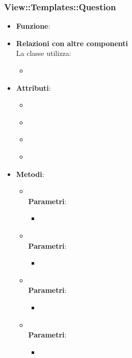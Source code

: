 \subsubsection{View::Templates::Question}
\begin{itemize}
\item\textbf{Funzione}:
\item\textbf{Relazioni con altre componenti}\\
La classe utilizza:
	\begin{itemize}
		\item
	\end{itemize}
\item\textbf{Attributi}:
	\begin{itemize}
		\item\code{}\\
		\item\code{}\\
		\item\code{}\\
		\item\code{}\\
	\end{itemize}
\item\textbf{Metodi}:
	\begin{itemize}
		\item\code{}\\
		\textbf{Parametri}:
			\begin{itemize}
				\item\code{}\\
			\end{itemize}
		\item\code{}\\
		\textbf{Parametri}:
			\begin{itemize}
				\item\code{}\\
			\end{itemize}
		\item\code{}\\
		\textbf{Parametri}:
			\begin{itemize}
				\item\code{}\\
			\end{itemize}
		\item\code{}\\
		\textbf{Parametri}:
			\begin{itemize}
				\item\code{}\\
			\end{itemize}
	\end{itemize}
\end{itemize}

